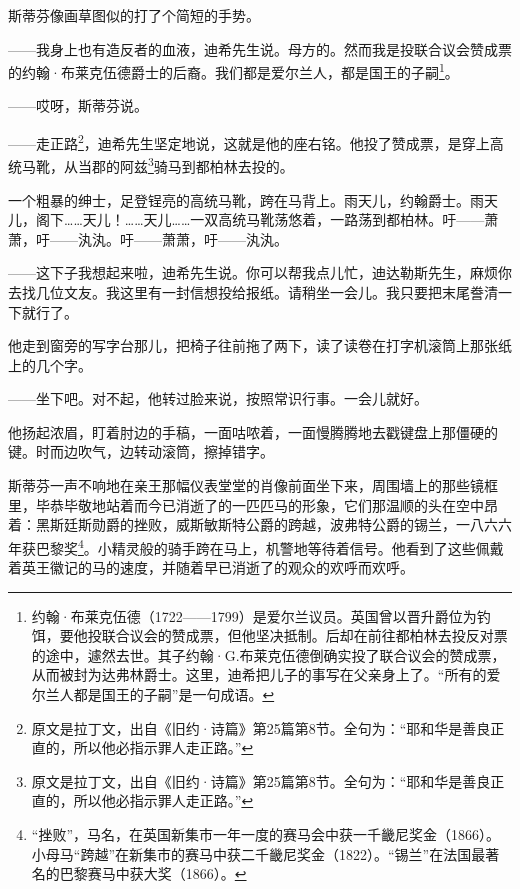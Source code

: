 \par 斯蒂芬像画草图似的打了个简短的手势。
\par ——我身上也有造反者的血液，迪希先生说。母方的。然而我是投联合议会赞成票的约翰·布莱克伍德爵士的后裔。我们都是爱尔兰人，都是国王的子嗣\footnote{约翰·布莱克伍德（1722——1799）是爱尔兰议员。英国曾以晋升爵位为钓饵，要他投联合议会的赞成票，但他坚决抵制。后却在前往都柏林去投反对票的途中，遽然去世。其子约翰·G.布莱克伍德倒确实投了联合议会的赞成票，从而被封为达弗林爵士。这里，迪希把儿子的事写在父亲身上了。“所有的爱尔兰人都是国王的子嗣”是一句成语。}。
\par ——哎呀，斯蒂芬说。
\par ——走正路\footnote{原文是拉丁文，出自《旧约·诗篇》第25篇第8节。全句为：“耶和华是善良正直的，所以他必指示罪人走正路。”}，迪希先生坚定地说，这就是他的座右铭。他投了赞成票，是穿上高统马靴，从当郡的阿兹\footnote{原文是拉丁文，出自《旧约·诗篇》第25篇第8节。全句为：“耶和华是善良正直的，所以他必指示罪人走正路。”}骑马到都柏林去投的。
\par 一个粗暴的绅士，足登锃亮的高统马靴，跨在马背上。雨天儿，约翰爵士。雨天儿，阁下……天儿！……天儿……一双高统马靴荡悠着，一路荡到都柏林。吁——萧萧，吁——汍汍。吁——萧萧，吁——汍汍。
\par ——这下子我想起来啦，迪希先生说。你可以帮我点儿忙，迪达勒斯先生，麻烦你去找几位文友。我这里有一封信想投给报纸。请稍坐一会儿。我只要把末尾誊清一下就行了。
\par 他走到窗旁的写字台那儿，把椅子往前拖了两下，读了读卷在打字机滚筒上那张纸上的几个字。
\par ——坐下吧。对不起，他转过脸来说，按照常识行事。一会儿就好。
\par 他扬起浓眉，盯着肘边的手稿，一面咕哝着，一面慢腾腾地去戳键盘上那僵硬的键。时而边吹气，边转动滚筒，擦掉错字。
\par 斯蒂芬一声不响地在亲王那幅仪表堂堂的肖像前面坐下来，周围墙上的那些镜框里，毕恭毕敬地站着而今已消逝了的一匹匹马的形象，它们那温顺的头在空中昂着：黑斯廷斯勋爵的挫败，威斯敏斯特公爵的跨越，波弗特公爵的锡兰，一八六六年获巴黎奖\footnote{“挫败”，马名，在英国新集市一年一度的赛马会中获一千畿尼奖金（1866）。小母马“跨越”在新集市的赛马中获二千畿尼奖金（1822）。“锡兰”在法国最著名的巴黎赛马中获大奖（1866）。}。小精灵般的骑手跨在马上，机警地等待着信号。他看到了这些佩戴着英王徽记的马的速度，并随着早已消逝了的观众的欢呼而欢呼。
